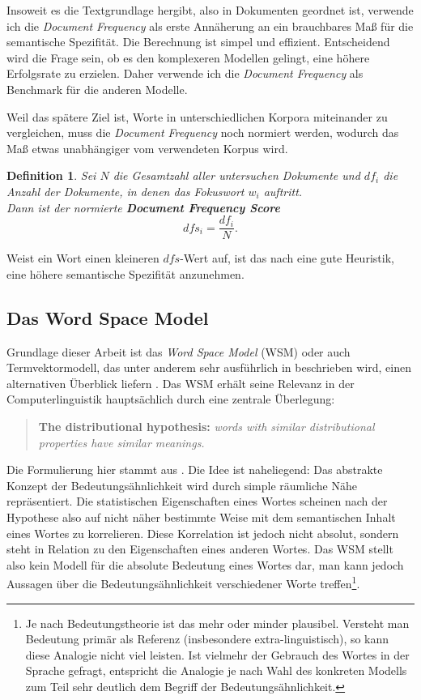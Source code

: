 \documentclass[11pt,numbers=noenddot]{scrartcl}
\newtheorem*{defi}{Definition}
\begin{document}
Insoweit es die Textgrundlage hergibt, also in Dokumenten geordnet ist, verwende ich die \emph{Document Frequency} als erste Annäherung an ein brauchbares Maß für die semantische Spezifität. Die Berechnung ist simpel und effizient. Entscheidend wird die Frage sein, ob es den komplexeren Modellen gelingt, eine höhere Erfolgsrate zu erzielen. Daher verwende ich die \emph{Document Frequency} als Benchmark für die anderen Modelle.

Weil das spätere Ziel ist, Worte in unterschiedlichen Korpora miteinander zu vergleichen, muss die \emph{Document Frequency} noch normiert werden, wodurch das Maß etwas unabhängiger vom verwendeten Korpus wird.

\begin{defi}
Sei $N$ die Gesamtzahl aller untersuchen Dokumente und $df_i$ die Anzahl der Dokumente, in denen das Fokuswort $w_i$ auftritt. \\ Dann ist der normierte \textbf{Document Frequency Score}
\begin{equation}
    dfs_i = \frac{df_i}{N}.
\end{equation}
\end{defi}

Weist ein Wort einen kleineren $dfs$-Wert auf, ist das nach \citet{Caraballo99determiningthe} eine gute Heuristik, eine höhere semantische Spezifität anzunehmen.

\subsection{Das Word Space Model}\label{wsm}
Grundlage dieser Arbeit ist das \emph{Word Space Model} (WSM) oder auch Termvektormodell, das unter anderem sehr ausführlich in \citet{sahlgren2006word} beschrieben wird, einen alternativen Überblick liefern \citet{Turney10fromfrequency}. Das WSM erhält seine Relevanz in der Computerlinguistik hauptsächlich durch eine zentrale Überlegung:
\begin{quote}
    \textbf{The distributional hypothesis:} \emph{words with similar distributional properties have similar meanings.}
\end{quote}
Die Formulierung hier stammt aus \citet[S. 21]{sahlgren2006word}. Die Idee ist naheliegend: Das abstrakte Konzept der Bedeutungsähnlichkeit wird durch simple räumliche Nähe repräsentiert. Die statistischen Eigenschaften eines Wortes scheinen nach der Hypothese also auf nicht näher bestimmte Weise mit dem semantischen Inhalt eines Wortes zu korrelieren. Diese Korrelation ist jedoch nicht absolut, sondern steht in Relation zu den Eigenschaften eines anderen Wortes. Das WSM stellt also kein Modell für die absolute Bedeutung eines Wortes dar, man kann jedoch Aussagen über die Bedeutungsähnlichkeit verschiedener Worte treffen\footnote{Je nach Bedeutungstheorie ist das mehr oder minder plausibel. Versteht man Bedeutung primär als Referenz (insbesondere extra-linguistisch), so kann diese Analogie nicht viel leisten. Ist vielmehr der Gebrauch des Wortes in der Sprache gefragt, entspricht die Analogie je nach Wahl des konkreten Modells zum Teil sehr deutlich dem Begriff der Bedeutungsähnlichkeit.}.
\end{document}
